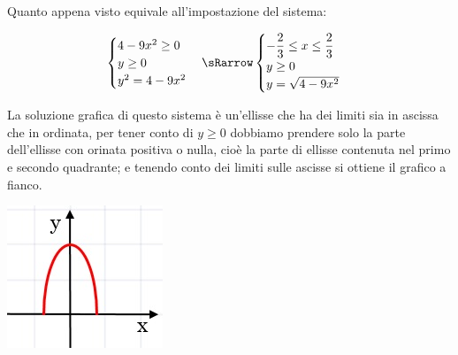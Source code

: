 Quanto appena visto equivale all'impostazione del sistema:

\[\begin{cases}  4-9x^{2}\geq0   \\ y\geq0  \\y^{2}=4-9x^{2} 
\end{cases} \sRarrow
\begin{cases}   -\dfrac{2}{3}\leq x\leq \dfrac{2}{3}   \\ y\geq0  \\ 
y=\sqrt{4-9x^{2}} \end{cases}\] 

\noindent \begin{minipage}{.75\textwidth}
La soluzione grafica di questo sistema è un'ellisse che ha 
dei limiti sia in ascissa che in ordinata, per tener conto di $ y\geq0 $ 
dobbiamo prendere solo la parte dell'ellisse con orinata positiva o nulla, 
cioè la parte di ellisse contenuta nel primo e secondo quadrante; e tenendo 
conto dei limiti sulle ascisse si ottiene il grafico a fianco.
  \end{minipage}
  \hfill
  \begin{minipage}{.2\textwidth}
    \includegraphics[width=\textwidth]{img/curva1.jpg}
  \end{minipage}

